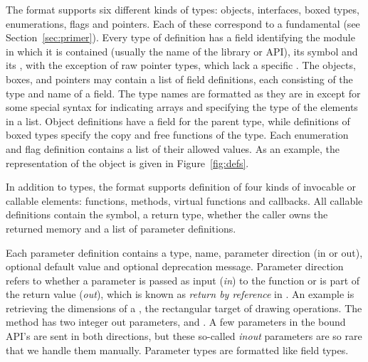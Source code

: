 \documentclass[article,shortnames]{jss}
\begin{document}
The  format supports six different kinds of types:
objects,
interfaces, boxed types, enumerations, flags and pointers. Each of
these correspond to a fundamental  (see Section~\ref{sec:primer}). 
Every type of definition has
a field identifying the module in which it is contained (usually the
name of the library or API), its  symbol and its
,
with the exception of raw pointer types, which lack a specific
. The objects, boxes, and pointers may contain a list of
field
definitions, each consisting of the type and name of a field. The type
names are formatted as they are in  except for some
special syntax for indicating arrays and specifying the type of the
elements in a list. Object definitions have a field for the parent
type, while definitions of boxed types specify the copy and free
functions of the type.  Each enumeration and flag definition contains
a list of their allowed values.  As an example, the 
representation of the  object is given in Figure~\ref{fig:defs}. 

In addition to types, the  format supports definition
of
four kinds of invocable or callable elements: functions, methods,
virtual functions and
callbacks. All callable definitions contain the  symbol, a
return type, whether the caller owns the returned memory and a list of
parameter definitions.

Each parameter definition contains a type,
name, parameter
direction (in or out),
optional default value and optional deprecation
message. Parameter direction refers to whether a parameter is passed
as input (\emph{in}) to the function or is part of the return value
(\emph{out}), which is known as \emph{return by reference} in
. An example is retrieving the dimensions of a
, the rectangular target of  drawing
operations. The method  has two integer out
parameters,  and . A few parameters in the
bound API's are sent in both directions, but these so-called
\emph{inout} parameters are so rare that we handle them manually.
Parameter types are formatted like field types. 
\end{document}

